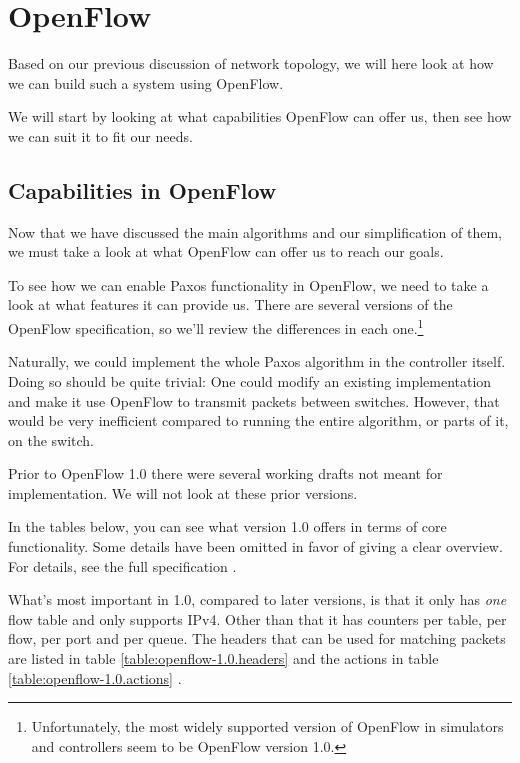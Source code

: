 \section{OpenFlow}
\label{chapter:openflow.design}

Based on our previous discussion of network topology, we will here look at
how we can build such a system using OpenFlow.

We will start by looking at what capabilities OpenFlow can offer us, then
see how we can suit it to fit our needs.

\subsection{Capabilities in OpenFlow}
\label{chapter:details.openflow}

Now that we have discussed the main algorithms and our simplification of
them, we must take a look at what OpenFlow can offer us to reach our goals.


To see how we can enable Paxos functionality in OpenFlow, we need to take a
look at what features it can provide us.  There are several versions of the
OpenFlow specification, so we'll review the differences in each
one.\footnote{Unfortunately, the most widely supported version of OpenFlow in
simulators and controllers seem to be OpenFlow version 1.0.}

Naturally, we could implement the whole Paxos algorithm in the controller
itself.  Doing so should be quite trivial: One could modify an existing
implementation and make it use OpenFlow to transmit packets between
switches.  However, that would be very inefficient compared to running the
entire algorithm, or parts of it, on the switch.

Prior to OpenFlow 1.0 \cite{openflow-1.0} there were several working
drafts not meant for implementation.  We will not look at these prior
versions.

In the tables below, you can see what version 1.0 offers in terms of core
functionality.  Some details have been omitted in favor of giving a clear
overview.  For details, see the full specification \cite{openflow-1.0}.

What's most important in 1.0, compared to later versions, is that it only
has \textit{one} flow table and only supports IPv4.  Other than that it has
counters per table, per flow, per port and per queue.  The headers that can
be used for matching packets are listed in table
\ref{table:openflow-1.0.headers}  and
the actions in table \ref{table:openflow-1.0.actions}
.


